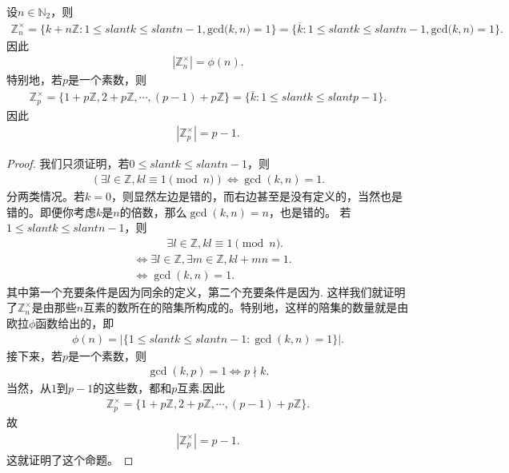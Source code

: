 \documentclass[../../main.tex]{subfiles}
\begin{document}
\begin{proposition}
设$n \in \mathbb{N}_2$，则
\begin{align*}
\mathbb{Z} _{n}^{\times}=\{k+n\mathbb{Z} :1\leqslant slant k\leqslant slant n-1,\mathrm{gcd(}k,n)=1\}=\{\overline{k}:1\leqslant slant k\leqslant slant n-1,\mathrm{gcd(}k,n)=1\}.
\end{align*}
因此 
\begin{align*}
|\mathbb{Z}_n^\times| = \phi(n) .
\end{align*}
特别地，若$p$是一个素数，则
\begin{align*}
\mathbb{Z}_p^\times = \{1 + p\mathbb{Z}, 2 + p\mathbb{Z}, \cdots, (p - 1) + p\mathbb{Z}\}=\{\overline{k}:1\leqslant slant k\leqslant slant p-1\}.
\end{align*}
因此
\begin{align*}
|\mathbb{Z}_p^\times| = p - 1 .
\end{align*}
\end{proposition}
\begin{proof}
我们只须证明，若$0 \leqslant slant k \leqslant slant n - 1$，则
\begin{align*}
(\exists l \in \mathbb{Z}, kl \equiv 1 \pmod{n}) \iff \gcd(k, n) = 1 .
\end{align*}
分两类情况。若$k = 0$，则显然左边是错的，而右边甚至是没有定义的，当然也是错的。即便你考虑$k$是$n$的倍数，那么$\gcd(k, n) = n$，也是错的。
若$1 \leqslant slant k \leqslant slant n - 1$，则
\begin{align*}
&\quad \quad \quad \exists l \in \mathbb{Z}, kl \equiv 1 \pmod{n} .
\\
&\iff \exists l \in \mathbb{Z}, \exists m \in \mathbb{Z}, kl + mn = 1 .
\\
&\iff \gcd(k, n) = 1 .
\end{align*}
其中第一个充要条件是因为同余的定义，第二个充要条件是因为.
这样我们就证明了$\mathbb{Z}_n^\times$是由那些$n$互素的数所在的陪集所构成的。特别地，这样的陪集的数量就是由欧拉$\phi$函数给出的，即
\begin{align*}
\phi(n) = |\{1 \leqslant slant k \leqslant slant n - 1 : \gcd(k, n) = 1\}| .
\end{align*}
接下来，若$p$是一个素数，则
\begin{align*}
\gcd(k, p) = 1 \iff p \nmid k.
\end{align*}
当然，从$1$到$p - 1$的这些数，都和$p$互素.因此
\begin{align*}
\mathbb{Z}_p^\times = \{1 + p\mathbb{Z}, 2 + p\mathbb{Z}, \cdots, (p - 1) + p\mathbb{Z}\} .
\end{align*}
故
\begin{align*}
|\mathbb{Z}_p^\times| = p - 1 .
\end{align*}
这就证明了这个命题。
\end{proof}
\end{document}
